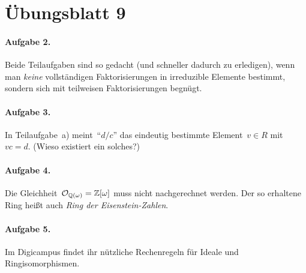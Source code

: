 \documentclass{algblatt}
\newcommand{\hint}[1]{\rotatebox{180}{\vbox{\textcolor{grey}{#1}}}}
\begin{document}
\hint{%
Bei Teilaufgabe~a) lässt sich ein Beispiel über~$R = \ZZ$ finden.
}


\section*{Übungsblatt 9}

\paragraph{Aufgabe 2.} Beide Teilaufgaben sind so gedacht (und schneller
dadurch zu erledigen), wenn man \emph{keine} vollständigen Faktorisierungen in
irreduzible Elemente bestimmt, sondern sich mit teilweisen Faktorisierungen
begnügt.

\paragraph{Aufgabe 3.} In Teilaufgabe~a) meint~"`$d/c$"' das eindeutig
bestimmte Element~$v \in R$ mit~$vc = d$. (Wieso existiert ein solches?)

\hint{%
Betrachtet für Teilaufgabe~b) den größten gemeinsamen Teiler von~$ac$
und~$bc$.}

\paragraph{Aufgabe 4.} Die Gleichheit~$\mathcal{O}_{\mathbb{Q}(\omega)} = \mathbb{Z}[\omega]$ muss
nicht nachgerechnet werden. Der so erhaltene Ring heißt auch \emph{Ring der
Eisenstein-Zahlen}.

\paragraph{Aufgabe 5.} Im Digicampus findet ihr nützliche Rechenregeln für
Ideale und Ringisomorphismen.
\end{document}
